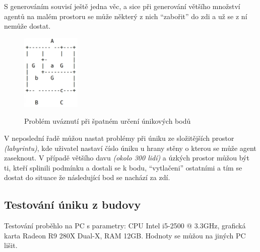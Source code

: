 \documentclass[czech,public,dept460,male,cpdeclaration]{diploma}
\begin{document}
S generováním souvisí ještě jedna věc, a sice při generování většího množství agentů na malém prostoru se může některý z nich ``zabořit'' do zdi a už se z ní nemůže dostat. 

\begin{figure}[H]\centering\includegraphics[width=0.25\textwidth]{Figures/buildingEscapeProblem2.jpg}\label{fig:buildingEscapeProblem1}
	\caption{Problém uváznutí při špatném určení únikových bodů}
	\label{fig:buildingEscapeProblem1}
\end{figure}

V neposlední řadě můžou nastat problémy při úniku ze složitějších prostor \textit{(labyrintu)}, kde uživatel nastaví číslo úniku u hrany stěny o kterou se může agent zaseknout. V případě většího davu \textit{(okolo 300 lidí)} a úzkých prostor můžou být ti, kteří splinili podmínku a dostali se k bodu, ``vytlačeni'' ostatními a tím se dostat do situace že následující bod se nachází za zdí. 
\subsection{Testování úniku z budovy}\label{sec:testovani-uniku-z-budovy}

Testování proběhlo na PC s parametry: CPU Intel i5-2500 @ 3.3GHz, grafická karta Radeon R9 280X Dual-X, RAM 12GB. Hodnoty se můžou na jiných PC lišit.


\end{document}
